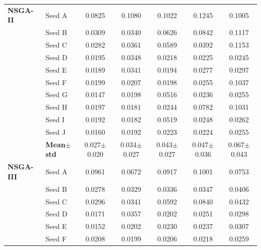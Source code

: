 \begin{table}[H]
{\begin{tabular}{@{}llccccc@{}}
\midrule
 \textbf{NSGA-II} & Seed A & {\small 0.0825} & {\small 0.1080} & {\small 0.1022} & {\small 0.1245} & {\small 0.1005} \\
  & Seed B & {\small 0.0309} & {\small 0.0340} & {\small 0.0626} & {\small 0.0842} & {\small 0.1117} \\
  & Seed C & {\small 0.0282} & {\small 0.0361} & {\small 0.0589} & {\small 0.0392} & {\small 0.1153} \\
  & Seed D & {\small 0.0195} & {\small 0.0348} & {\small 0.0218} & {\small 0.0225} & {\small 0.0245} \\
  & Seed E & {\small 0.0189} & {\small 0.0341} & {\small 0.0194} & {\small 0.0277} & {\small 0.0297} \\
  & Seed F & {\small 0.0199} & {\small 0.0207} & {\small 0.0198} & {\small 0.0255} & {\small 0.1037} \\
  & Seed G & {\small 0.0147} & {\small 0.0198} & {\small 0.0516} & {\small 0.0236} & {\small 0.0255} \\
  & Seed H & {\small 0.0197} & {\small 0.0181} & {\small 0.0244} & {\small 0.0782} & {\small 0.1031} \\
  & Seed I & {\small 0.0192} & {\small 0.0182} & {\small 0.0519} & {\small 0.0248} & {\small 0.0262} \\
  & Seed J & {\small 0.0160} & {\small 0.0192} & {\small 0.0223} & {\small 0.0224} & {\small 0.0255} \\
 & \textbf{Mean$\pm$std} & \cellcolor{ForestGreen!25}0.027$\pm$0.020 & \cellcolor{ForestGreen!25}0.034$\pm$0.027 & \cellcolor{ForestGreen!25}0.043$\pm$0.027 & \cellcolor{ForestGreen!25}0.047$\pm$0.036 & \cellcolor{ForestGreen!25}0.067$\pm$0.043 \\
\midrule
 \textbf{NSGA-III} & Seed A & {\small 0.0961} & {\small 0.0672} & {\small 0.0917} & {\small 0.1001} & {\small 0.0753} \\
  & Seed B & {\small 0.0278} & {\small 0.0329} & {\small 0.0336} & {\small 0.0347} & {\small 0.0406} \\
  & Seed C & {\small 0.0296} & {\small 0.0341} & {\small 0.0592} & {\small 0.0840} & {\small 0.0432} \\
  & Seed D & {\small 0.0171} & {\small 0.0357} & {\small 0.0202} & {\small 0.0251} & {\small 0.0298} \\
  & Seed E & {\small 0.0152} & {\small 0.0202} & {\small 0.0230} & {\small 0.0237} & {\small 0.0307} \\
  & Seed F & {\small 0.0208} & {\small 0.0199} & {\small 0.0206} & {\small 0.0218} & {\small 0.0259} \\

\end{tabular}}
\end{table}
